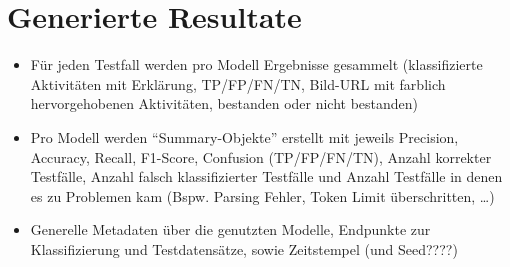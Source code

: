 \section{Generierte Resultate}\label{sec:generierte-resultate}

\begin{itemize}
    \item Für jeden Testfall werden pro Modell Ergebnisse gesammelt (klassifizierte Aktivitäten mit Erklärung, TP/FP/FN/TN, Bild-URL mit farblich hervorgehobenen Aktivitäten, bestanden oder nicht bestanden)
    \item Pro Modell werden ``Summary-Objekte'' erstellt mit jeweils Precision, Accuracy, Recall, F1-Score, Confusion (TP/FP/FN/TN), Anzahl korrekter Testfälle, Anzahl falsch klassifizierter Testfälle und Anzahl Testfälle in denen es zu Problemen kam (Bspw. Parsing Fehler, Token Limit überschritten, \ldots)
    \item Generelle Metadaten über die genutzten Modelle, Endpunkte zur Klassifizierung und Testdatensätze, sowie Zeitstempel (und Seed????)
\end{itemize}